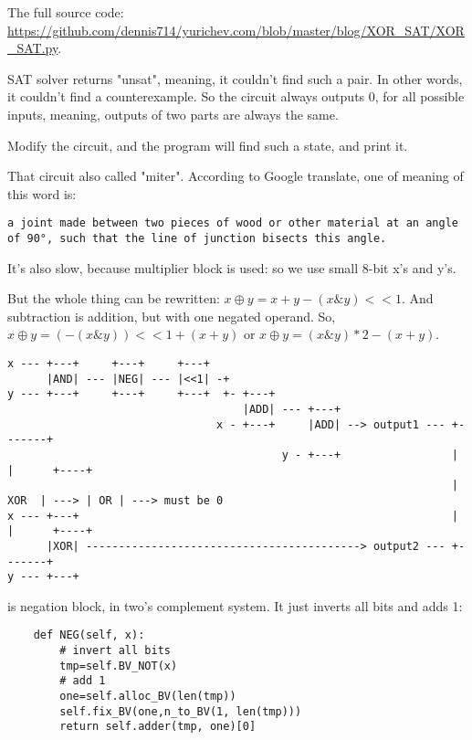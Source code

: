 The full source code: \url{https://github.com/dennis714/yurichev.com/blob/master/blog/XOR_SAT/XOR_SAT.py}.

SAT solver returns "unsat", meaning, it couldn't find such a pair.
In other words, it couldn't find a counterexample.
So the circuit always outputs 0, for all possible inputs, meaning, outputs of two parts are always the same.

Modify the circuit, and the program will find such a state, and print it.

That circuit also called "miter".
According to Google translate, one of meaning of this word is:

\begin{lstlisting}
a joint made between two pieces of wood or other material at an angle of 90°, such that the line of junction bisects this angle.
\end{lstlisting}

It's also slow, because multiplier block is used: so we use small 8-bit x's and y's.

But the whole thing can be rewritten: $x \oplus y = x+y - (x \& y)<<1$.
And subtraction is addition, but with one negated operand.
So, $x \oplus y = (-(x \& y))<<1 + (x + y)$ or
$x \oplus y = (x \& y)*2 - (x + y)$.

\begin{lstlisting}
x --- +---+     +---+     +---+
      |AND| --- |NEG| --- |<<1| -+ 
y --- +---+     +---+     +---+  +- +---+
                                    |ADD| --- +---+
                                x - +---+     |ADD| --> output1 --- +-------+
                                          y - +---+                 |       |      +----+
                                                                    |  XOR  | ---> | OR | ---> must be 0
x --- +---+                                                         |       |      +----+
      |XOR| ------------------------------------------> output2 --- +-------+
y --- +---+
\end{lstlisting}

 is negation block, in two's complement system.
It just inverts all bits and adds 1:

\begin{lstlisting}
    def NEG(self, x):
        # invert all bits
        tmp=self.BV_NOT(x)
        # add 1
        one=self.alloc_BV(len(tmp))
        self.fix_BV(one,n_to_BV(1, len(tmp)))
        return self.adder(tmp, one)[0]
\end{lstlisting}

